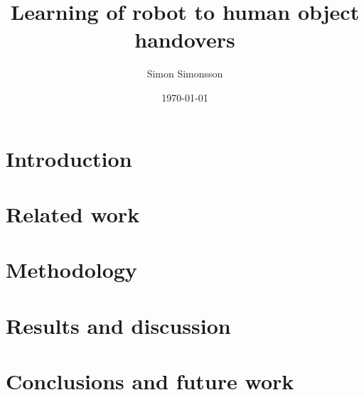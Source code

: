 \documentclass{kththesis}
\title{Learning of robot to human object handovers}
\author{Simon Simonsson}
\date{\today}
\begin{document}
\frontmatter %
\titlepage

\begin{abstract}
	
\end{abstract}

\begin{otherlanguage}{swedish}
	\begin{abstract}
		
	\end{abstract}
\end{otherlanguage}

\tableofcontents

\mainmatter %

\chapter{Introduction}


\chapter{Related work}


\chapter{Methodology}


\chapter{Results and discussion}


\chapter{Conclusions and future work}


\printbibliography[heading=bibintoc] %

\appendix

\end{document}
